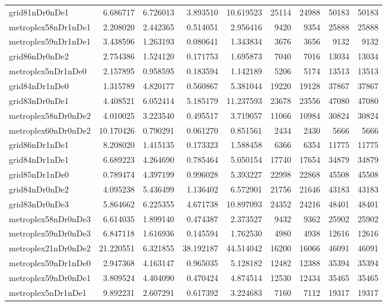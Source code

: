 \begin{longtable}{|l|r|r|r|r|r|r|r|r|}
grid81nDr0nDe1 & 6.686717 & 6.726013 & 3.893510 & 10.619523 & 25114 & 24988 & 50183 & 50183 \\
metroplex58nDr1nDe1 & 2.208020 & 2.442365 & 0.514051 & 2.956416 & 9420 & 9354 & 25888 & 25888 \\
metroplex59nDr1nDe1 & 3.438596 & 1.263193 & 0.080641 & 1.343834 & 3676 & 3656 & 9132 & 9132 \\
grid86nDr0nDe2 & 2.754386 & 1.524120 & 0.171753 & 1.695873 & 7040 & 7016 & 13034 & 13034 \\
metroplex5nDr1nDe0 & 2.157895 & 0.958595 & 0.183594 & 1.142189 & 5206 & 5174 & 13513 & 13513 \\
grid84nDr1nDe0 & 1.315789 & 4.820177 & 0.560867 & 5.381044 & 19220 & 19128 & 37867 & 37867 \\
grid83nDr0nDe1 & 4.408521 & 6.052414 & 5.185179 & 11.237593 & 23678 & 23556 & 47080 & 47080 \\
metroplex58nDr0nDe2 & 4.010025 & 3.223540 & 0.495517 & 3.719057 & 11066 & 10984 & 30824 & 30824 \\
metroplex60nDr0nDe2 & 10.170426 & 0.790291 & 0.061270 & 0.851561 & 2434 & 2430 & 5666 & 5666 \\
grid86nDr1nDe1 & 8.208020 & 1.415135 & 0.173323 & 1.588458 & 6366 & 6354 & 11775 & 11775 \\
grid84nDr1nDe1 & 6.689223 & 4.264690 & 0.785464 & 5.050154 & 17740 & 17654 & 34879 & 34879 \\
grid85nDr1nDe0 & 0.789474 & 4.397199 & 0.996028 & 5.393227 & 22998 & 22868 & 45508 & 45508 \\
grid84nDr0nDe2 & 4.095238 & 5.436499 & 1.136402 & 6.572901 & 21756 & 21646 & 43183 & 43183 \\
grid83nDr0nDe3 & 5.864662 & 6.225355 & 4.671738 & 10.897093 & 24352 & 24216 & 48401 & 48401 \\
metroplex58nDr0nDe3 & 6.614035 & 1.899140 & 0.474387 & 2.373527 & 9432 & 9362 & 25902 & 25902 \\
metroplex59nDr0nDe3 & 6.847118 & 1.616936 & 0.145594 & 1.762530 & 4980 & 4938 & 12616 & 12616 \\
metroplex21nDr0nDe2 & 21.220551 & 6.321855 & 38.192187 & 44.514042 & 16200 & 16066 & 46091 & 46091 \\
metroplex59nDr1nDe0 & 2.947368 & 4.163147 & 0.965035 & 5.128182 & 12482 & 12388 & 35394 & 35394 \\
metroplex59nDr0nDe1 & 3.809524 & 4.404090 & 0.470424 & 4.874514 & 12530 & 12434 & 35465 & 35465 \\
metroplex5nDr1nDe1 & 9.892231 & 2.607291 & 0.617392 & 3.224683 & 7160 & 7112 & 19317 & 19317 \\

\end{longtable}
